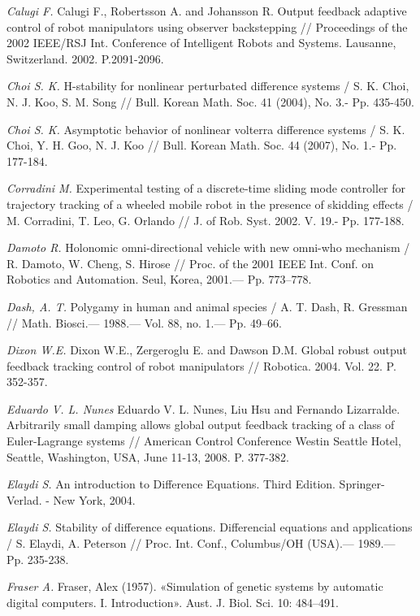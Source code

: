 \begin{thebibliography}{10}
	{\it Calugi F.} Calugi F., Robertsson A. and Johansson R. Output feedback adaptive control of robot manipulators using observer backstepping // Proceedings of the 2002 IEEE/RSJ Int. Conference of Intelligent Robots and Systems. Lausanne, Switzerland. 2002. P.2091-2096.
	
	{\it Choi S. K.} H-stability for nonlinear perturbated difference systems / S. K. Choi, N. J. Koo, S. M. Song // Bull. Korean Math. Soc. 41 (2004), No. 3.- Pp. 435-450.
	
	{\it Choi S. K.} Asymptotic behavior of nonlinear volterra difference systems / S. K. Choi, Y. H. Goo, N. J. Koo // Bull. Korean Math. Soc. 44 (2007), No. 1.- Pp. 177-184.
	
	
	{\it Corradini M.} Experimental testing of a discrete-time sliding mode controller for trajectory tracking of a wheeled mobile robot in the presence of skidding effects / M. Corradini, T. Leo, G. Orlando // J. of Rob. Syst. 2002. V. 19.- Pp. 177-188.
	
	{\it Damoto R.} Holonomic omni-directional vehicle with new omni-who mechanism / R. Damoto, W. Cheng, S. Hirose // Proc. of the 2001 IEEE Int. Conf. on Robotics and Automation. Seul, Korea, 2001.— Pp. 773–778.
	
	
	{\it Dash, A. T.} Polygamy in human and animal species / A. T. Dash, R. Gressman // Math. Biosci.— 1988.— Vol. 88, no. 1.— Pp. 49–66.
	
	{\it Dixon W.E.} Dixon W.E., Zergeroglu E. and Dawson D.M. Global robust output feedback tracking control of robot manipulators // Robotica. 2004. Vol. 22. P. 352-357.
	
	
	{\it Eduardo V. L. Nunes} Eduardo V. L. Nunes, Liu Hsu and Fernando Lizarralde. Arbitrarily small damping allows global output feedback tracking of a class of Euler-Lagrange systems // American Control Conference Westin Seattle Hotel, Seattle, Washington, USA, June 11-13, 2008. P. 377-382.
	
	{\it Elaydi S.} An introduction to Difference Equations. Third Edition. Springer-Verlad. - New York, 2004.
	
	{\it Elaydi S.} Stability of difference equations. Differencial equations and applications / S. Elaydi, A. Peterson // Proc. Int. Conf., Columbus/OH (USA).— 1989.— Pp. 235-238.
	
	{\it Fraser A.} Fraser, Alex (1957). «Simulation of genetic systems by automatic digital computers. I. Introduction». Aust. J. Biol. Sci. 10: 484–491.
	

\end{thebibliography}
